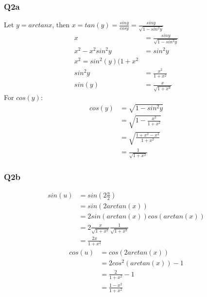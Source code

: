 \documentclass{article}
\begin{document}
\subsubsection*{Q2a}
Let $y = arctan x$, then $x = tan (y) = \frac{sin y }{cos y} = \frac{sin y }{\sqrt{1-sin^{2}y}}$
\begin{align*}
x &= \frac{sin y }{\sqrt{1-sin^{2}y}}\\
x^{2} - x^{2}sin^{2}y &= sin^{2}y\\
x^{2} = sin^{2}(y) (1+x^{2}\\
sin^{2}y &= \frac{x^{2}}{1+x^{2}}\\
sin (y) &= \frac{x}{\sqrt{1+x^{2}}}
\end{align*}
For $cos(y)$:
\begin{align*}
cos(y) &= \sqrt{1-sin^{2}y}\\
&= \sqrt{1-\frac{x^{2}}{1+x^{2}}}\\
&=\sqrt{\frac{1+x^{2} - x^{2}}{1+x^{2}}}\\
&=\frac{1}{\sqrt{1+x^{2}}}
\end{align*}
\subsubsection*{Q2b}
\begin{align*}
sin(u) &= sin(2\frac{u}{2})\\
&= sin(2arctan(x))\\
&=2sin(arctan(x))cos(arctan(x))\\
&=2\frac{x}{\sqrt{1+x^{2}}}\frac{1}{\sqrt{1+x^2}}\\
&=\frac{2x}{1+x^{2}}
\end{align*}
\begin{align*}
cos(u) &= cos(2arctan(x))\\
&= 2cos^{2}(arctan(x)) - 1\\
&=\frac{2}{1+x^{2}} - 1\\
&= \frac{1-x^{2}}{1+x^{2}}
\end{align*}
\end{document}
